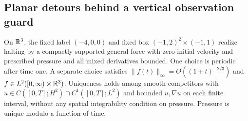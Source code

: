 \subsection{Planar detours behind a vertical observation guard}
\label{bc:guarded-planar-section}


\begin{theorem}
\label{bc:guarded-planar-event}
On $\mathbb R^3$, the fixed label $(-4,0,0)$ and fixed box
$(-1,2)^2\times(-1,1)$ realize halting by a compactly supported general
force with zero initial velocity and prescribed pressure and all mixed
derivatives bounded. One choice is periodic after time one. A separate
choice satisfies $\|f(t)\|_\infty=O((1+t)^{-2/3})$ and
$f\in L^2([0,\infty)\times\mathbb R^3)$.
Uniqueness holds among smooth competitors with
$u\in C([0,T];H^2)\cap C^1([0,T];L^2)$ and bounded $u,\nabla u$
on each finite interval, without any spatial integrability condition on
pressure. Pressure is unique modulo a function of time.
\end{theorem}
